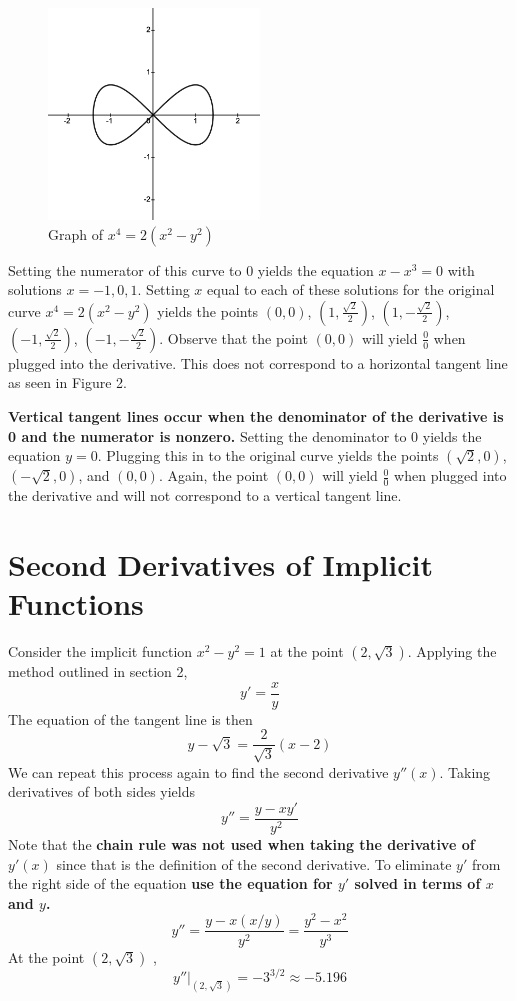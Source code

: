\documentclass[12pt, letterpaper]{article}
\begin{document}
\begin{figure}[h]
	\centering
	\includegraphics[width=0.5\textwidth]{fig2}
	\caption{Graph of $x^4 = 2(x^2-y^2)$}
\end{figure}

\noindent Setting the numerator of this curve to 0 yields the equation $x-x^3 = 0$ with solutions $x = -1, 0, 1$. Setting $x$ equal to each of these solutions for the original curve $x^4 = 2(x^2-y^2)$ yields the points $(0,0)$, $(1,\frac{\sqrt{2}}{2})$, $(1,-\frac{\sqrt{2}}{2})$, $(-1,\frac{\sqrt{2}}{2})$, $(-1,-\frac{\sqrt{2}}{2})$. Observe that the point $(0,0)$ will yield $\frac{0}{0}$ when plugged into the derivative. This does not correspond to a horizontal tangent line as seen in Figure 2.

\textbf{Vertical tangent lines occur when the denominator of the derivative is 0 and the numerator is nonzero.}  Setting the denominator to 0 yields the equation $y=0$. Plugging this in to the original curve yields the points $(\sqrt{2},0)$, $(-\sqrt{2},0)$, and $(0,0)$. Again, the point $(0,0)$ will yield $\frac{0}{0}$ when plugged into the derivative and will not correspond to a vertical tangent line.


\section{Second Derivatives of Implicit Functions}
Consider the implicit function $x^2-y^2 = 1$ at the point $(2,\sqrt{3})$. Applying the method outlined in section 2, \[y' = \frac{x}{y}\] The equation of the tangent line is then \[y-\sqrt{3} = \frac{2}{\sqrt{3}}(x-2)\] We can repeat this process again to find the second derivative $y''(x)$. Taking derivatives of both sides yields \[y'' = \frac{y-xy'}{y^2}\] Note that the \textbf{chain rule was not used when taking the derivative of $y'(x)$} since that is the definition of the second derivative. To eliminate $y'$ from the right side of the equation \textbf{use the equation for $y'$ solved in terms of $x$ and $y$.} \[y'' = \frac{y-x(x/y)}{y^2} = \frac{y^2-x^2}{y^3}\] At the point $(2,\sqrt{3})$ , \[y''|_{(2,\sqrt{3})} = -3^{3/2} \approx -5.196\]
\end{document}
